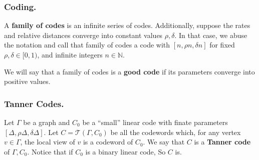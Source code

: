 \documentclass[usenames, aspectratio=169]{beamer}
\begin{document}
\begin{frame}
  \frametitle{ Coding. }
\begin{definition} 
  A \textbf{family of codes} is an infinite series of codes. Additionally, suppose the rates and relative distances converge into constant values $\rho,\delta$. In that case, we abuse the notation and call that family of codes a code with $[n, \rho n, \delta n]$ for fixed $\rho, \delta\in [ 0,1 )$, and infinite integers $n \in \mathbb{N}$.     
  \end{definition}
\begin{definition} 
  We will say that a family of codes is a \textbf{good code} if its parameters converge into positive values. 
  \end{definition}
\end{frame} 

\begin{frame}
  \frametitle{ Tanner Codes. }
  \begin{definition} Let $\Gamma$ be a graph and $C_{0}$ be a ``small'' linear code with finate parameters $[\Delta, \rho\Delta, \delta\Delta]$. Let $ C = \mathcal{T}\left( \Gamma, C_{0} \right)$  be all the codewords which, for any vertex $v\in \Gamma$, the local view of $v$ is a codeword of $C_{0}$. We say that $C$ is a \textbf{Tanner code}\label{Tan} of $\Gamma, C_{0}$. Notice that if $C_{0}$ is a binary linear code, So $C$ is.  
  \end{definition}
\end{frame}
\end{document}
